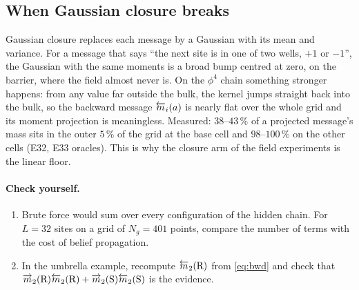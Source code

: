 \subsection{When Gaussian closure breaks}\label{sec:closurefail}

Gaussian closure replaces each message by a Gaussian with its mean and variance. For a message that says ``the
next site is in one of two wells, $+1$ or $-1$'', the Gaussian with the same moments is a broad bump centred at
zero, on the barrier, where the field almost never is. On the $\phi^4$ chain something stronger happens: from
any value far outside the bulk, the kernel jumps straight back into the bulk, so the backward message
$\overleftarrow{m}_i(a)$ is nearly flat over the whole grid and its moment projection is meaningless. Measured: $38$--$43\,\%$ of
a projected message's mass sits in the outer $5\,\%$ of the grid at the base cell and $98$--$100\,\%$ on the other
cells (E32, E33 oracles). This is why the closure arm of the field experiments is the linear floor.

\paragraph{Check yourself.}
\begin{enumerate}[label=\thesection.\arabic*,leftmargin=2.2em]
\item Brute force would sum over every configuration of the hidden chain. For $L=32$ sites on a grid of $N_g=401$
  points, compare the number of terms with the cost of belief propagation.
\item In the umbrella example, recompute $\overleftarrow{m}_2(\mathrm R)$ from \eqref{eq:bwd} and check that
  $\overrightarrow{m}_2(\mathrm R)\overleftarrow{m}_2(\mathrm R)+\overrightarrow{m}_2(\mathrm S)\overleftarrow{m}_2(\mathrm S)$ is the evidence.
\end{enumerate}
